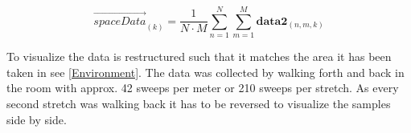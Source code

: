 \begin{equation}\label{eq:spaceMean}
\overrightarrow{spaceData}_{(k)} = \frac{1}{N\cdot M}\sum_{n = 1}^{N}\sum_{m = 1}^{M} \textbf{data2}_{(n,m,k)}
\end{equation}
\begin{where}
\end{where}


To visualize the data is restructured such that it matches the area it has been taken in see \autoref{Environment}. The data was collected by walking forth and back in the room with approx. 42 sweeps per meter or 210 sweeps per stretch. As every second stretch was walking back it has to be reversed to visualize the samples side by side. 



